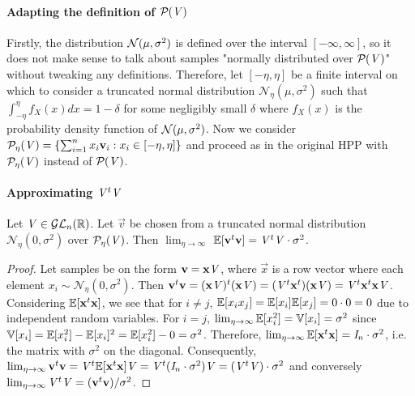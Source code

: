 \paragraph{Adapting the definition of $\PP{V}$}
Firstly, the distribution $\normdist{\mu}{\sigma}$ is defined over the interval $[- \infty, \infty]$, so it does not make sense to talk about samples "normally distributed over $\PP{V}$" without tweaking any definitions.
Therefore, let $[- \eta, \eta]$ be a finite interval on which to consider a truncated normal distribution $\mathcal{N}_{\eta}(\mu, \sigma^2)$ such that $\int_{-\eta}^{\eta} f_X(x) dx = 1 - \delta$ for some negligibly small $\delta$
where $f_X(x)$ is the probability density function of $\normdist{\mu}{\sigma}$.
Now we consider $\PP[\eta]{V} = \{\sum_{i=1}^n x_i \vec{v}_i : x_i \in [-\eta, \eta]\}$ and proceed as in the original HPP with $\PP[\eta]{V}$ instead of $\PP{V}$.

\paragraph{Approximating $\mat{V}^t \mat{V}$}
Let $\mat{V} \in \GLnR$. Let $\vec{v}$ be chosen from a truncated normal distribution $\mathcal{N}_{\eta}(0, \sigma^2)$ over $\PP[\eta]{V}$.
Then $\lim_{\eta\to\infty}$ $\bb{E}[\vec{v}^t\vec{v}] = \mat{V}^t \mat{V} \cdot \sigma^2$.

\begin{proof}
    Let samples be on the form $\vec{v} = \vec{x}\mat{V}$, where $\vec{x}$ is a row vector where each element $x_i \sim \mathcal{N}_{\eta}(0, \sigma^2)$.
    Then $\vec{v}^t\vec{v} = (\vec{x} \mat{V})^t (\vec{x} \mat{V}) = (\mat{V}^t \vec{x}^t)(\vec{x} \mat{V}) = \mat{V}^t \vec{x}^t \vec{x} \mat{V}$. Considering $\bb{E}[\vec{x}^t \vec{x}]$, we see that for $i \neq j$, 
$\bb{E}[x_i x_j] = \bb{E}[x_i] \bb{E}[x_j] = 0 \cdot 0 = 0$ due to independent random variables.
For $i=j$, $\lim_{\eta\to\infty} \bb{E}[x_i^2] = \bb{V}[x_i] = \sigma^2$ since $\bb{V}[x_i] = \bb{E}[x_i^2] - \bb{E}[x_i]^2 = \bb{E}[x_i^2] - 0 = \sigma ^2$.
Therefore, $\lim_{\eta\to\infty} \bb{E}[\vec{x}^t \vec{x}] = \mat{I}_n \cdot \sigma^2$, i.e. the matrix with $\sigma ^2$ on the diagonal.
Consequently, $\lim_{\eta\to\infty} \vec{v}^t \vec{v} = \mat{V}^t \bb{E}[\vec{x}^t\vec{x}] \mat{V} = \mat{V}^t (\mat{I}_n \cdot \sigma^2) \mat{V} = (\mat{V}^t \mat{V}) \cdot \sigma ^2$ 
and conversely $\lim_{\eta\to\infty} \mat{V}^t \mat{V} = (\vec{v}^t \vec{v})/ \sigma^2$.
\end{proof}

